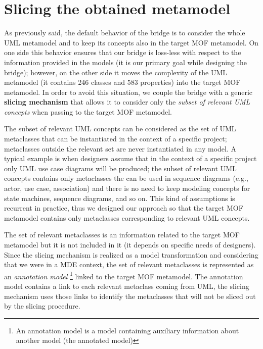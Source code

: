 

\section{Slicing the obtained metamodel}\label{sec:slicing}

As previously said, the default behavior of the bridge is to consider the whole UML metamodel and to keep its concepts also in the
target MOF metamodel. On one side this behavior ensures that our bridge is loss-less with respect to the information
provided in the models (it is our primary goal while designing the bridge);
however, on the other side it moves the complexity of the UML metamodel (it contains 246 classes and 583 properties)
into the target MOF metamodel. 
In order to avoid this situation, we couple the bridge with a generic \textbf{slicing mechanism} that allows it to consider  
only the \textit{subset of relevant UML concepts} when passing to the target MOF metamodel.

The subset of relevant UML concepts can be considered as the set of UML metaclasses that can be instantiated in the context of a specific project;
metaclasses outside the relevant set are never instantiated in any model.
A typical example is when designers assume that in the context of a specific project only UML
use case diagrams will be produced; the subset of relevant UML concepts contains only metaclasses 
the can be used in sequence diagrams (e.g., actor, use case, association) and there is no need to keep modeling concepts
for state machines, sequence diagrams, and so on.
This kind of assumptions is recurrent in practice, thus we designed our approach so that the target MOF metamodel contains only 
metaclasses corresponding to relevant UML concepts.

The set of relevant metaclasses is an information related to the target MOF metamodel but it is not included in it (it depends on specific needs of designers). 
Since the slicing mechanism is realized as a model transformation and considering that we were in a MDE context, the set of relevant
metaclasses is represented as an \textit{annotation model}
\footnote{An annotation model is a model containing auxiliary information about another model (the annotated model)\cite{MCDFthesis}} linked to the target MOF metamodel. The annotation model contains a link to each relevant metaclass coming from UML, the slicing mechanism uses those links to identify the metaclasses that will not be sliced out by the slicing procedure.

